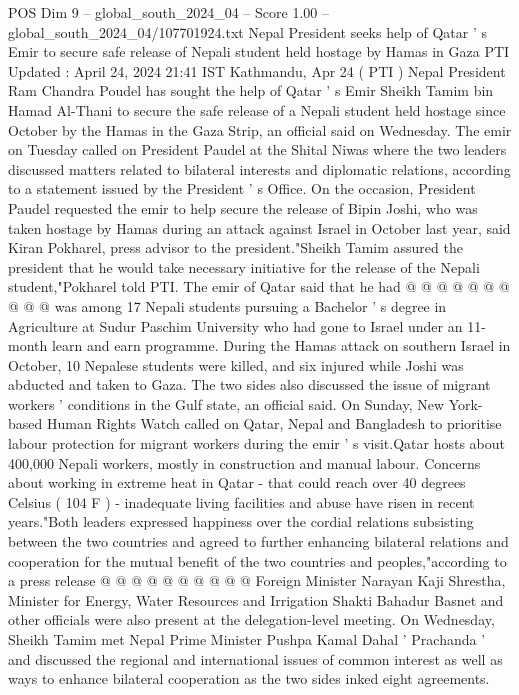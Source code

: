 \begin{textsample}{POS Dim 9 – global\_south\_2024\_04 – Score 1.00 – global\_south\_2024\_04/107701924.txt}  \label{ex:f9_pos_121}
Nepal President seeks help of Qatar ' s Emir to secure safe release of Nepali student held hostage by Hamas in Gaza PTI Updated : April 24, 2024 21:41 IST Kathmandu, Apr 24 ( PTI ) Nepal President Ram Chandra Poudel has sought the help of Qatar ' s Emir Sheikh Tamim bin Hamad Al-Thani to secure the safe release of a Nepali student held hostage since October by the Hamas in the Gaza Strip, an official said on Wednesday.
The emir on Tuesday called on President Paudel at the Shital Niwas where the two leaders discussed matters related to bilateral interests and diplomatic relations, according to a statement issued by the President ' s Office.
On the occasion, President Paudel requested the emir to help secure the release of Bipin Joshi, who was taken hostage by Hamas during an attack against Israel in October last year, said Kiran Pokharel, press advisor to the president."Sheikh Tamim assured the president that he would take necessary initiative for the release of the Nepali student,"Pokharel told PTI.
The emir of Qatar said that he had @ @ @ @ @ @ @ @ @ @ was among 17 Nepali students pursuing a Bachelor ' s degree in Agriculture at Sudur Paschim University who had gone to Israel under an 11-month learn and earn programme.
During the Hamas attack on southern Israel in October, 10 Nepalese students were killed, and six injured while Joshi was abducted and taken to Gaza.
The two sides also discussed the issue of migrant workers ' conditions in the Gulf state, an official said.
On Sunday, New York-based Human Rights Watch called on Qatar, Nepal and Bangladesh to prioritise labour protection for migrant workers during the emir ' s visit.Qatar hosts about 400,000 Nepali workers, mostly in construction and manual labour.
Concerns about working in extreme heat in Qatar - that could reach over 40 degrees Celsius ( 104 F ) - inadequate living facilities and abuse have risen in recent years."Both leaders expressed happiness over the cordial relations subsisting between the two countries and agreed to further enhancing bilateral relations and cooperation for the mutual benefit of the two countries and peoples,"according to a press release @ @ @ @ @ @ @ @ @ @ Foreign Minister Narayan Kaji Shrestha, Minister for Energy, Water Resources and Irrigation Shakti Bahadur Basnet and other officials were also present at the delegation-level meeting.
On Wednesday, Sheikh Tamim met Nepal Prime Minister Pushpa Kamal Dahal ' Prachanda ' and discussed the regional and international issues of common interest as well as ways to enhance bilateral cooperation as the two sides inked eight agreements.

\end{textsample}
